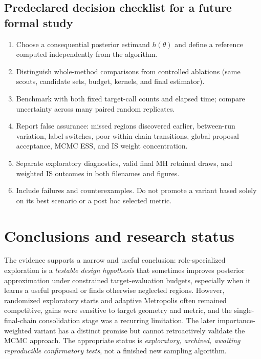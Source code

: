 \documentclass[11pt,letterpaper]{article}
\begin{document}
\subsection{Predeclared decision checklist for a future formal study}
\begin{enumerate}
\item Choose a consequential posterior estimand \(h(\theta)\) and define a reference computed independently from the algorithm.
\item Distinguish whole-method comparisons from controlled ablations (same scouts, candidate sets, budget, kernels, and final estimator).
\item Benchmark with both fixed target-call counts and elapsed time; compare uncertainty across many paired random replicates.
\item Report false assurance: missed regions discovered earlier, between-run variation, label switches, poor within-chain transitions, global proposal acceptance, MCMC ESS, and IS weight concentration.
\item Separate exploratory diagnostics, valid final MH retained draws, and weighted IS outcomes in both filenames and figures.
\item Include failures and counterexamples. Do not promote a variant based solely on its best scenario or a post hoc selected metric.
\end{enumerate}

\section{Conclusions and research status}
The evidence supports a narrow and useful conclusion: role-specialized exploration is a \emph{testable design hypothesis} that sometimes improves posterior approximation under constrained target-evaluation budgets, especially when it learns a useful proposal or finds otherwise neglected regions. However, randomized exploratory starts and adaptive Metropolis often remained competitive, gains were sensitive to target geometry and metric, and the single-final-chain consolidation stage was a recurring limitation. The later importance-weighted variant has a distinct promise but cannot retroactively validate the MCMC approach. The appropriate status is \emph{exploratory, archived, awaiting reproducible confirmatory tests}, not a finished new sampling algorithm.
\end{document}

